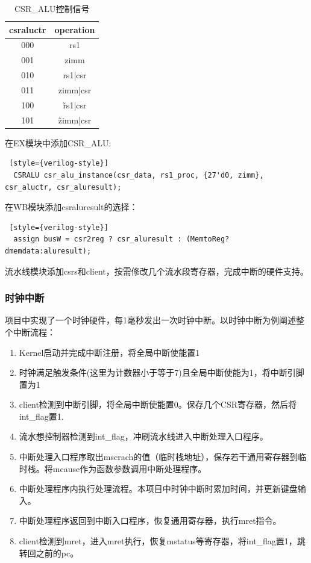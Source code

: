 \documentclass[]{article}
\begin{document}
  \begin{table}[h!]
      \centering
      \begin{tabular}{c|c}
        \hline
        csraluctr & operation \\
        \hline
        000 & rs1 \\
        001 & zimm \\
        010 & rs1|csr \\
        011 & zimm|csr \\
        100 & \~rs1|csr \\
        101 & \~zimm|csr \\
        \hline
      \end{tabular}
      \caption{CSR\_ALU控制信号}
      \label{tab:csraluctr}
  \end{table}
  
  在EX模块中添加CSR\_ALU:
    \begin{lstlisting} [style={verilog-style}]
  CSRALU csr_alu_instance(csr_data, rs1_proc, {27'd0, zimm}, csr_aluctr, csr_aluresult);
  \end{lstlisting}
  在WB模块添加csraluresult的选择：
      \begin{lstlisting} [style={verilog-style}]
  assign busW = csr2reg ? csr_aluresult : (MemtoReg?dmemdata:aluresult);
  \end{lstlisting}
  流水线模块添加csrs和client，按需修改几个流水段寄存器，完成中断的硬件支持。
  \subsubsection{时钟中断}
  项目中实现了一个时钟硬件，每1毫秒发出一次时钟中断。以时钟中断为例阐述整个中断流程：
  \begin{enumerate}
      \item Kernel启动并完成中断注册，将全局中断使能置1
      \item 时钟满足触发条件(这里为计数器小于等于7)且全局中断使能为1，将中断引脚置为1
      \item client检测到中断引脚，将全局中断使能置0。保存几个CSR寄存器，然后将int\_flag置1.
      \item 流水想控制器检测到int\_flag，冲刷流水线进入中断处理入口程序。
      \item 中断处理入口程序取出mscrach的值（临时栈地址），保存若干通用寄存器到临时栈。将mcause作为函数参数调用中断处理程序。
      \item 中断处理程序内执行处理流程。本项目中时钟中断时累加时间，并更新键盘输入。
      \item 中断处理程序返回到中断入口程序，恢复通用寄存器，执行mret指令。
      \item client检测到mret，进入mret执行，恢复mstatus等寄存器，将int\_flag置1，跳转回之前的pc。
  \end{enumerate}
\end{document}
